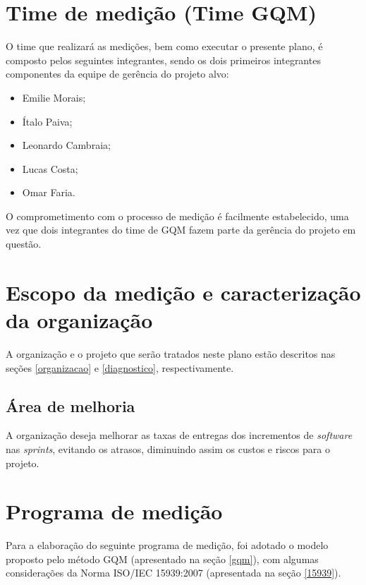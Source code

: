 \label{plano_medicao}

\section{Time de medição (Time GQM)}

	O time que realizará as medições, bem como executar o presente plano, é composto pelos seguintes integrantes,
	sendo os dois primeiros integrantes componentes da equipe de gerência do projeto alvo:

	\begin{itemize}
	 \item Emilie Morais;
	 \item Ítalo Paiva;
	 \item Leonardo Cambraia;
	 \item Lucas Costa;
	 \item Omar Faria.
	\end{itemize}

	O comprometimento com o processo de medição é facilmente estabelecido, uma vez que dois integrantes do time de GQM
	fazem parte da gerência do projeto em questão.

    \section{Escopo da medição e caracterização da organização}

      A organização e o projeto que serão tratados neste plano estão descritos nas seções
      \ref{organizacao} e \ref{diagnostico}, respectivamente.

      \subsection{Área de melhoria}

	A organização deseja melhorar as taxas de entregas dos incrementos de \textit{software} nas \textit{sprints}, evitando os
	atrasos, diminuindo assim os custos e riscos para o projeto.


    \section{Programa de medição}

      Para a elaboração do seguinte programa de medição, foi adotado o modelo proposto pelo método GQM (apresentado na seção \ref{gqm}),
      com algumas considerações da Norma ISO/IEC 15939:2007 (apresentada na seção \ref{15939}).

